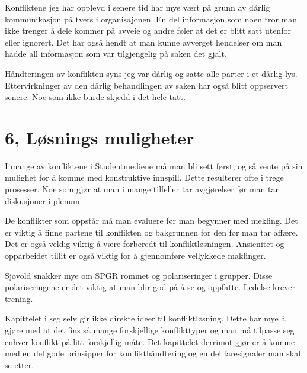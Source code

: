 \documentclass[12pt, a4paper]{article}
\begin{document}
Konfliktene jeg har opplevd i senere tid har mye vært på grunn av dårlig
kommunikasjon på tvers i organisajonen. En del informasjon som noen tror man
ikke trenger å dele kommer på avveie og andre føler at det er blitt satt
utenfor eller ignorert. Det har også hendt at man kunne avverget hendelser om
man hadde all informasjon som var tilgjengelig på saken det gjalt. 

Håndteringen av konflikten syns jeg var dårlig og satte alle parter i et dårlig
lys. Ettervirkninger av den dårlig behandlingen av saken har også blitt
oppservert senere. Noe som ikke burde skjedd i det hele tatt.  

\section{6, Løsnings muligheter}
I mange av konfliktene i Studentmediene må man bli sett først, og så vente på
sin mulighet for å komme med konstruktive innspill. Dette resulterer ofte i
trege prosesser. Noe som gjør at man i mange tilfeller tar avgjørelser før man
tar diskusjoner i plenum. 

De konflikter som oppstår må man evaluere før man begynner med mekling. Det er
viktig å finne partene til konflikten og bakgrunnen for den før man tar affære.
Det er også veldig viktig å være forberedt til konfliktløsningen. Ansienitet og
opparbeidet tillit er også viktig for å gjennomføre vellykkede maklinger. 

Sjøvold snakker mye om SPGR rommet og polariseringer i grupper. Disse
polariseringene er det viktig at man blir god på å se og oppfatte. Ledelse
krever trening.  

Kapittelet i seg selv gir ikke direkte ideer til konfliktløsning. Dette har mye
å gjøre med at det fins så mange forskjellige konflikttyper og man må tilpasse
seg enhver konflikt på litt forskjellig måte. Det kapittelet derrimot gjør er å
komme med en del gode prinsipper for konflikthåndtering og en del faresignaler
man skal se etter. 
\end{document}
